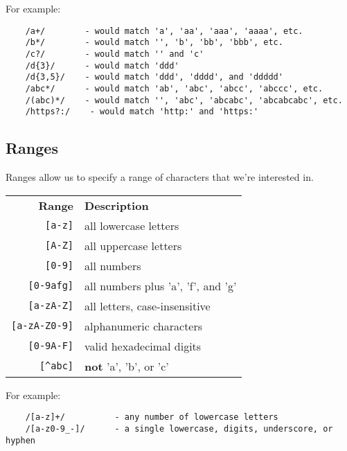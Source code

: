 \par\bigskip

For example:

\begin{verbatim}
    /a+/        - would match 'a', 'aa', 'aaa', 'aaaa', etc.
    /b*/        - would match '', 'b', 'bb', 'bbb', etc.
    /c?/        - would match '' and 'c'
    /d{3}/      - would match 'ddd'
    /d{3,5}/    - would match 'ddd', 'dddd', and 'ddddd'
    /abc*/      - would match 'ab', 'abc', 'abcc', 'abccc', etc.
    /(abc)*/    - would match '', 'abc', 'abcabc', 'abcabcabc', etc.
    /https?:/    - would match 'http:' and 'https:'
\end{verbatim}


\subsection{Ranges}

Ranges allow us to specify a range of characters that we're interested in.
\\

\begin{small}
    \begin{tabu}{r X}
        \textbf{Range}          & \textbf{Description} \\
        \texttt{[a-z]}          & all lowercase letters \\
        \texttt{[A-Z]}          & all uppercase letters \\
        \texttt{[0-9]}          & all numbers \\
        \texttt{[0-9afg]}       & all numbers plus 'a', 'f', and 'g' \\
        \texttt{[a-zA-Z]}       & all letters, case-insensitive \\
        \texttt{[a-zA-Z0-9]}    & alphanumeric characters \\
        \texttt{[0-9A-F]}       & valid hexadecimal digits \\
        \texttt{[\textasciicircum abc]}         & \textbf{not} 'a', 'b', or 'c'
    \end{tabu}
\end{small}

\par\bigskip

For example:

\begin{verbatim}
    /[a-z]+/          - any number of lowercase letters
    /[a-z0-9_-]/      - a single lowercase, digits, underscore, or hyphen
\end{verbatim}

